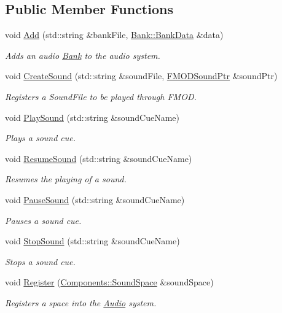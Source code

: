 \subsection*{Public Member Functions}
\begin{DoxyCompactItemize}
\item 
void \hyperlink{classDCEngine_1_1Systems_1_1Audio_a72be5cf056ad0d270796be33a3010fd1}{Add} (std\-::string \&bank\-File, \hyperlink{structDCEngine_1_1Bank_1_1BankData}{Bank\-::\-Bank\-Data} \&data)
\begin{DoxyCompactList}\small\item\em Adds an audio \hyperlink{classDCEngine_1_1Bank}{Bank} to the audio system. \end{DoxyCompactList}\item 
void \hyperlink{classDCEngine_1_1Systems_1_1Audio_a23e10ddebd31ba775a0f1891cc9506b2}{Create\-Sound} (std\-::string \&sound\-File, \hyperlink{classDCEngine_1_1FMODSoundPtr}{F\-M\-O\-D\-Sound\-Ptr} \&sound\-Ptr)
\begin{DoxyCompactList}\small\item\em Registers a Sound\-File to be played through F\-M\-O\-D. \end{DoxyCompactList}\item 
void \hyperlink{classDCEngine_1_1Systems_1_1Audio_a990c57ddc737fd6152bf2f193c41bf46}{Play\-Sound} (std\-::string \&sound\-Cue\-Name)
\begin{DoxyCompactList}\small\item\em Plays a sound cue. \end{DoxyCompactList}\item 
void \hyperlink{classDCEngine_1_1Systems_1_1Audio_a25cef2ad0d520f38089854092caa488e}{Resume\-Sound} (std\-::string \&sound\-Cue\-Name)
\begin{DoxyCompactList}\small\item\em Resumes the playing of a sound. \end{DoxyCompactList}\item 
void \hyperlink{classDCEngine_1_1Systems_1_1Audio_a3cacbad9590e1eb47a8835c342e86742}{Pause\-Sound} (std\-::string \&sound\-Cue\-Name)
\begin{DoxyCompactList}\small\item\em Pauses a sound cue. \end{DoxyCompactList}\item 
void \hyperlink{classDCEngine_1_1Systems_1_1Audio_aaf100dab7a69eb0e1a5068efff6b2774}{Stop\-Sound} (std\-::string \&sound\-Cue\-Name)
\begin{DoxyCompactList}\small\item\em Stops a sound cue. \end{DoxyCompactList}\item 
void \hyperlink{classDCEngine_1_1Systems_1_1Audio_a839f8b25f202211e0828a8bc210d090e}{Register} (\hyperlink{classDCEngine_1_1Components_1_1SoundSpace}{Components\-::\-Sound\-Space} \&sound\-Space)
\begin{DoxyCompactList}\small\item\em Registers a space into the \hyperlink{classDCEngine_1_1Systems_1_1Audio}{Audio} system. \end{DoxyCompactList}\end{DoxyCompactItemize}
